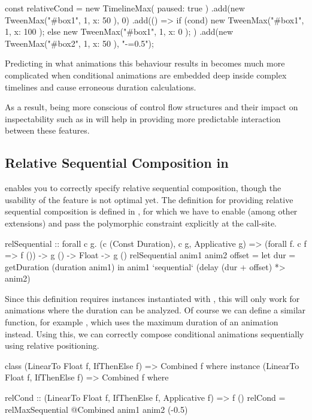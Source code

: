 \begin{js}
const relativeCond = new TimelineMax({ paused: true })
  .add(new TweenMax("#box1", 1, { x: 50 }), 0)
  .add(() => { if (cond) { new TweenMax("#box1", 1, { x: 100 });
               } else { new TweenMax("#box1", 1, { x: 0 }); } })
  .add(new TweenMax("#box2", 1, { x: 50 }), "-=0.5");
\end{js}

Predicting in what animations this behaviour results in becomes much more complicated when conditional animations are embedded deep inside complex timelines and cause erroneous duration calculations.

As a result, being more conscious of control flow structures and their impact on inspectability such as in \dsl{} will help in providing more predictable interaction between these features.

\subsection{Relative Sequential Composition in \dsl{}}

\dsl{} enables you to correctly specify relative sequential composition, though the usability of the feature is not optimal yet. The definition for providing relative sequential composition is defined in , for which we have to enable  (among other extensions) and pass the polymorphic constraint  explicitly at the call-site.

\begin{spec}
relSequential :: forall c g.
  (c (Const Duration), c g, Applicative g) =>
  (forall f. c f => f ()) -> g () -> Float -> g ()
relSequential anim1 anim2 offset = let
  dur = getDuration (duration anim1)
  in anim1 `sequential` (delay (dur + offset) *> anim2)
\end{spec}

Since this definition requires instances instantiated with , this will only work for animations where the duration can be analyzed. Of course we can define a similar function, for example , which uses the maximum duration of an animation instead. Using this, we can correctly compose conditional animations sequentially using relative positioning.

\begin{spec}
class (LinearTo Float f, IfThenElse f) => Combined f where
instance (LinearTo Float f, IfThenElse f) => Combined f where

relCond :: (LinearTo Float f, IfThenElse f, Applicative f) => f ()
relCond = relMaxSequential @Combined anim1 anim2 (-0.5)
\end{spec}

